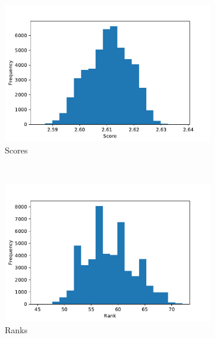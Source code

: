 \documentclass{article}
\begin{document}
\begin{figure}[!hbtp]
    \centering
    \begin{subfigure}[t]{.3\textwidth}
        \centering
        \includegraphics[width=\textwidth]{./assets/standard_tft_scores.pdf}
        \caption{Scores}
        \label{fig:tit_for_tat_scores}
    \end{subfigure}%
    ~
    \begin{subfigure}[t]{.3\textwidth}
        \centering
        \includegraphics[width=\textwidth]{./assets/standard_tft_ranks.pdf}
        \caption{Ranks}
        \label{fig:tit_for_tat_ranks}
    \end{subfigure}%
    ~
    \begin{subfigure}[t]{.3\textwidth}
        \centering

\end{subfigure}
\end{figure}
\end{document}
